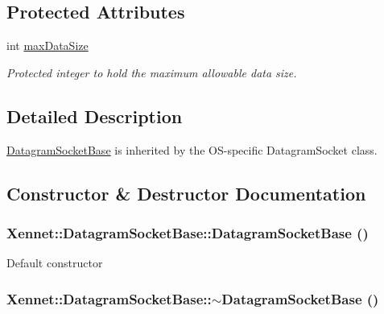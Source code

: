 \subsection*{Protected Attributes}
\begin{CompactItemize}
\item 
int \hyperlink{classXennet_1_1DatagramSocketBase_a5168c12db4203f683f0b0dbda6c61b5}{maxDataSize}
\begin{CompactList}\small\item\em Protected integer to hold the maximum allowable data size. \item\end{CompactList}\end{CompactItemize}


\subsection{Detailed Description}
\hyperlink{classXennet_1_1DatagramSocketBase}{DatagramSocketBase} is inherited by the OS-specific DatagramSocket class. 

\subsection{Constructor \& Destructor Documentation}
\hypertarget{classXennet_1_1DatagramSocketBase_11b1321a39d3b80cc80197f34da75f1f}{
\subsubsection{\setlength{\rightskip}{0pt plus 5cm}Xennet::DatagramSocketBase::DatagramSocketBase ()}}
\label{classXennet_1_1DatagramSocketBase_11b1321a39d3b80cc80197f34da75f1f}


Default constructor \hypertarget{classXennet_1_1DatagramSocketBase_b4a3902fd34b76a17452832a4d0e94a4}{
\subsubsection{\setlength{\rightskip}{0pt plus 5cm}Xennet::DatagramSocketBase::$\sim$DatagramSocketBase ()}}
\label{classXennet_1_1DatagramSocketBase_b4a3902fd34b76a17452832a4d0e94a4}


